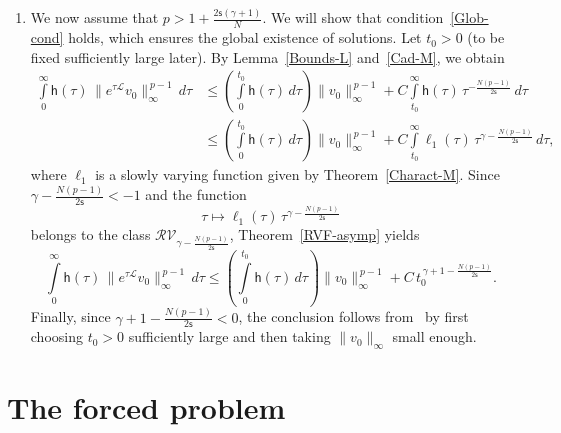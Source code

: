 \documentclass[12pt,reqno]{amsart}
\theoremstyle{plain}
\theoremstyle{definition}
\theoremstyle{remark}
\numberwithin{equation}{section}
\newcommand{\sL}{\mathscr{L}}
\newcommand{\h}{\mathsf h}
\newcommand{\ts}{\mathsf{s}}
\begin{document}
\begin{enumerate}[label=(\roman*)]
    \item We now assume that $p > 1 + \frac{2\ts(\gamma+1)}{N}$. We will show that condition~\eqref{Glob-cond} holds, which ensures the global existence of solutions.  
    Let $t_0>0$ (to be fixed sufficiently large later). By Lemma~\ref{Bounds-L} and~\eqref{Cad-M}, we obtain
    \begin{equation}
        \label{Glob1}
        \begin{split}
          \int\limits_0^\infty \h(\tau) \,\|e^{\tau \sL} v_0\|_\infty^{\,p-1} \, d\tau
          &\leq \left( \int\limits_0^{t_0} \h(\tau)\, d\tau \right) \|v_0\|_\infty^{\,p-1}
             + C \int\limits_{t_0}^\infty \h(\tau)\, \tau^{-\frac{N(p-1)}{2\ts}} \, d\tau \\
          &\leq \left( \int\limits_0^{t_0} \h(\tau)\, d\tau \right) \|v_0\|_\infty^{\,p-1}
             + C \int\limits_{t_0}^\infty \ell_1(\tau)\, \tau^{\gamma-\frac{N(p-1)}{2\ts}} \, d\tau,
        \end{split}
    \end{equation}
    where $\ell_1$ is a slowly varying function given by Theorem~\ref{Charact-M}.  
    Since $\gamma - \frac{N(p-1)}{2\ts} < -1$ and the function
    \[
        \tau \longmapsto \ell_1(\tau)\, \tau^{\gamma-\frac{N(p-1)}{2\ts}}
    \]
    belongs to the class $\mathcal{RV}_{\gamma-\frac{N(p-1)}{2\ts}}$, Theorem~\ref{RVF-asymp} yields
    \begin{equation}
        \label{Glob2}
        \int\limits_0^\infty \h(\tau) \,\|e^{\tau \sL} v_0\|_\infty^{\,p-1} \, d\tau
        \leq \left( \int\limits_0^{t_0} \h(\tau)\, d\tau \right) \|v_0\|_\infty^{\,p-1}
        + C\, t_0^{\,\gamma+1-\frac{N(p-1)}{2\ts}}.
    \end{equation}
    Finally, since $\gamma+1-\frac{N(p-1)}{2\ts}<0$, the conclusion follows from~\cite[Theorem~6]{Migu-2025} by first choosing $t_0>0$ sufficiently large and then taking $\|v_0\|_\infty$ small enough.
\end{enumerate}

\section{The forced problem}
\label{Forced}
\end{document}
